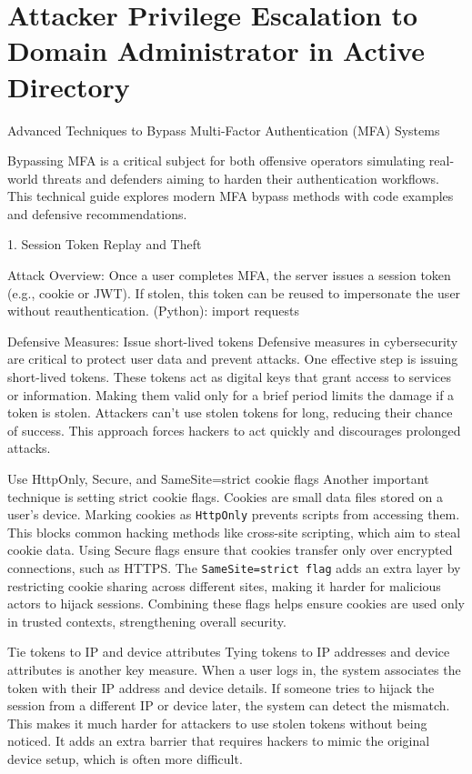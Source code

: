 
\section{Attacker Privilege Escalation to Domain Administrator in Active Directory}

Advanced Techniques to Bypass Multi-Factor Authentication (MFA) Systems

Bypassing MFA is a critical subject for both offensive operators simulating real-world threats and defenders aiming to harden their authentication workflows. This technical guide explores modern MFA bypass methods with code examples and defensive recommendations.

1. Session Token Replay and Theft

Attack Overview:
Once a user completes MFA, the server issues a session token (e.g., cookie or JWT). If stolen, this token can be reused to impersonate the user without reauthentication.
(Python):
import requests 


Defensive Measures:
Issue short-lived tokens
Defensive measures in cybersecurity are critical to protect user data and prevent attacks. One effective step is issuing short-lived tokens. These tokens act as digital keys that grant access to services or information. Making them valid only for a brief period limits the damage if a token is stolen. Attackers can’t use stolen tokens for long, reducing their chance of success. This approach forces hackers to act quickly and discourages prolonged attacks.

Use HttpOnly, Secure, and SameSite=strict cookie flags
Another important technique is setting strict cookie flags. Cookies are small data files stored on a user’s device. Marking cookies as \texttt{HttpOnly} prevents scripts from accessing them. This blocks common hacking methods like cross-site scripting, which aim to steal cookie data. Using Secure flags ensure that cookies transfer only over encrypted connections, such as HTTPS. The \texttt{SameSite=strict flag} adds an extra layer by restricting cookie sharing across different sites, making it harder for malicious actors to hijack sessions. Combining these flags helps ensure cookies are used only in trusted contexts, strengthening overall security.

Tie tokens to IP and device attributes
Tying tokens to IP addresses and device attributes is another key measure. When a user logs in, the system associates the token with their IP address and device details. If someone tries to hijack the session from a different IP or device later, the system can detect the mismatch. This makes it much harder for attackers to use stolen tokens without being noticed. It adds an extra barrier that requires hackers to mimic the original device setup, which is often more difficult.


